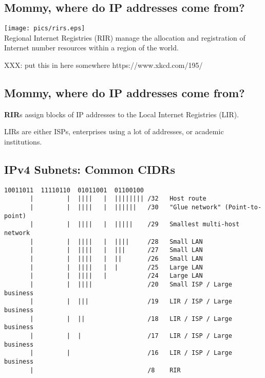 \documentclass[xga]{xdvislides}
\begin{document}
\subsection{Mommy, where do IP addresses come from?}
\vspace*{\fill}
\begin{center}
	\texttt{[image: pics/rirs.eps]} \\
	\vspace{.5in}
	Regional Internet Registries (RIR) manage the allocation and
registration of Internet number resources within a region of the world.
\end{center}
\vspace*{\fill}

XXX: put this in here somewhere
https://www.xkcd.com/195/

\subsection{Mommy, where do IP addresses come from?}
\vspace*{\fill}
\begin{center}
{\bf RIR}s assign blocks of IP addresses to the Local Internet Registries (LIR).
\\
\vspace{.5in}

LIRs are either ISPs, enterprises using a lot of addresses, or academic
institutions.
\end{center}
\vspace*{\fill}

\subsection{IPv4 Subnets: Common CIDRs}
\begin{verbatim}
10011011  11110110  01011001  01100100
       |         |  ||||   |  |||||||| /32   Host route
       |         |  ||||   |  ||||||   /30   "Glue network" (Point-to-point)
       |         |  ||||   |  |||||    /29   Smallest multi-host network
       |         |  ||||   |  ||||     /28   Small LAN
       |         |  ||||   |  |||      /27   Small LAN
       |         |  ||||   |  ||       /26   Small LAN
       |         |  ||||   |  |        /25   Large LAN
       |         |  ||||   |           /24   Large LAN
       |         |  ||||               /20   Small ISP / Large business
       |         |  |||                /19   LIR / ISP / Large business
       |         |  ||                 /18   LIR / ISP / Large business
       |         |  |                  /17   LIR / ISP / Large business
       |         |                     /16   LIR / ISP / Large business
       |                               /8    RIR
\end{verbatim}
\end{document}

